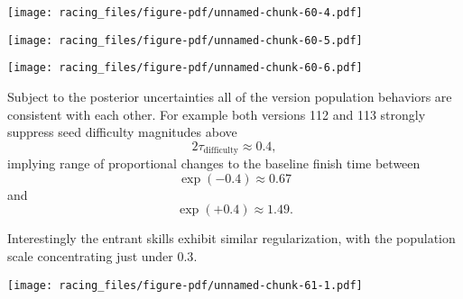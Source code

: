 \documentclass[
  letterpaper,
  DIV=11,
  numbers=noendperiod]{scrartcl}
\newenvironment{Shaded}{\begin{snugshade}}{\end{snugshade}}
\newcommand{\AttributeTok}[1]{\textcolor[rgb]{0.40,0.45,0.13}{#1}}
\newcommand{\ControlFlowTok}[1]{\textcolor[rgb]{0.00,0.23,0.31}{#1}}
\newcommand{\DecValTok}[1]{\textcolor[rgb]{0.68,0.00,0.00}{#1}}
\newcommand{\FunctionTok}[1]{\textcolor[rgb]{0.28,0.35,0.67}{#1}}
\newcommand{\NormalTok}[1]{\textcolor[rgb]{0.00,0.23,0.31}{#1}}
\newcommand{\OtherTok}[1]{\textcolor[rgb]{0.00,0.23,0.31}{#1}}
\newcommand{\SpecialCharTok}[1]{\textcolor[rgb]{0.37,0.37,0.37}{#1}}
\newcommand{\StringTok}[1]{\textcolor[rgb]{0.13,0.47,0.30}{#1}}
\begin{document}
\texttt{[image: racing\_files/figure-pdf/unnamed-chunk-60-4.pdf]}

\texttt{[image: racing\_files/figure-pdf/unnamed-chunk-60-5.pdf]}

\texttt{[image: racing\_files/figure-pdf/unnamed-chunk-60-6.pdf]}

Subject to the posterior uncertainties all of the version population
behaviors are consistent with each other. For example both versions 112
and 113 strongly suppress seed difficulty magnitudes above \[
2 \tau_{\mathrm{difficulty}} \approx 0.4,
\] implying range of proportional changes to the baseline finish time
between \[
\exp(-0.4) \approx 0.67
\] and \[
\exp(+0.4) \approx 1.49.
\]

Interestingly the entrant skills exhibit similar regularization, with
the population scale concentrating just under \(0.3\).

\begin{Shaded}
\end{Shaded}

\texttt{[image: racing\_files/figure-pdf/unnamed-chunk-61-1.pdf]}
\end{document}

